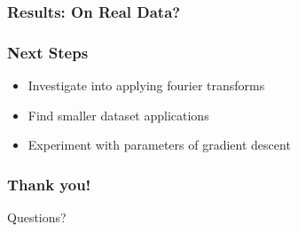 \begin{frame}[t]
    \frametitle{Results: On Real Data?}


\end{frame}

\begin{frame}[t]
    \frametitle{Next Steps}

    \begin{itemize}
        \item Investigate into applying fourier transforms
        \item Find smaller dataset applications
        \item Experiment with parameters of gradient descent
    \end{itemize}
\end{frame}

\begin{frame}[t]
    \frametitle{Thank you!}
    Questions?
\end{frame}